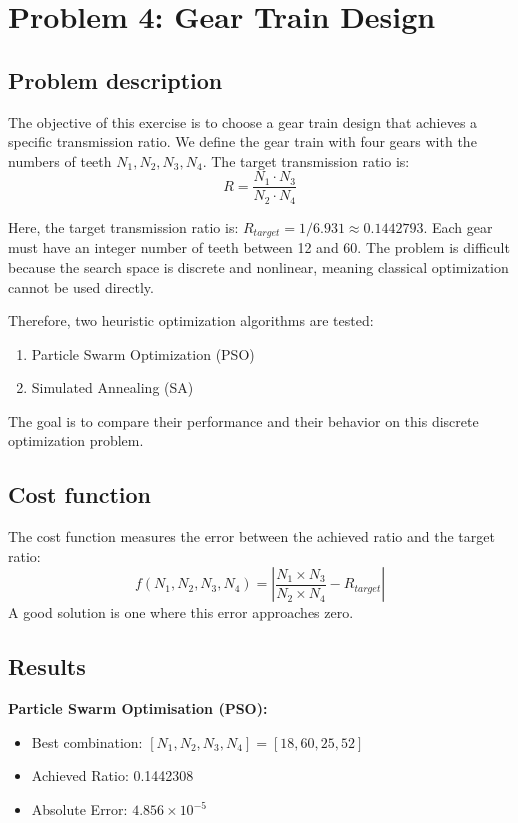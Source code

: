 \section{Problem 4: Gear Train Design}

\subsection{Problem description}
The objective of this exercise is to choose a gear train design that achieves a specific transmission ratio.
We define the gear train with four gears with the numbers of teeth $N_1, N_2, N_3, N_4$.
The target transmission ratio is: 
\begin{equation}
R = \frac{N_1 \cdot N_3}{N_2 \cdot N_4}
\end{equation}

Here, the target transmission ratio is: $R_{target} = 1/6.931 \approx 0.1442793$.
Each gear must have an integer number of teeth between 12 and 60.
The problem is difficult because the search space is discrete and nonlinear, meaning classical optimization cannot be used directly.

Therefore, two heuristic optimization algorithms are tested: 
\begin{enumerate}
    \item Particle Swarm Optimization (PSO)
    \item Simulated Annealing (SA)
\end{enumerate}

The goal is to compare their performance and their behavior on this discrete optimization problem.

\subsection{Cost function}
The cost function measures the error between the achieved ratio and the target ratio:
\begin{equation}
f(N_1,N_2,N_3,N_4 ) = \left| \frac{N_1 \times N_3}{N_2 \times N_4} - R_{target} \right|
\end{equation}
A good solution is one where this error approaches zero.

\subsection{Results}

\textbf{Particle Swarm Optimisation (PSO):}
\begin{itemize}
    \item Best combination: $[N_1, N_2, N_3, N_4] = [18, 60, 25, 52]$
    \item Achieved Ratio: 0.1442308
    \item Absolute Error: $4.856 \times 10^{-5}$
\end{itemize}

